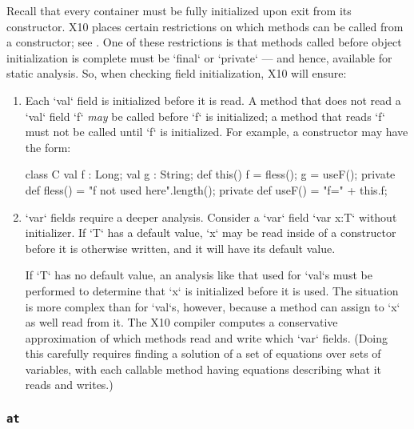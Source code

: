Recall that every container must be fully initialized upon exit
from its constructor.  
X10 places certain restrictions on which methods can be called from a
constructor; see .  One of these restrictions is that
methods called before object initialization is complete must be \xcd`final` or
\xcd`private` --- and hence, available for static analysis.  So, when checking
field initialization, X10 will ensure: 
\begin{enumerate}
\item Each \xcd`val` field is initialized before it is read.   
      A method that does not read a \xcd`val` field \xcd`f` {\em may} be
      called before \xcd`f` is initialized; a method that reads \xcd`f` must
      not be called until \xcd`f` is initialized.        
      For example, 
      a constructor may have the form:
\begin{xten}
class C {
  val f : Long;
  val g : String;
  def this() {
     f = fless();
     g = useF();
  }
  private def fless() = "f not used here".length();
  private def useF() = "f=" + this.f;
}
\end{xten}
%

\item \xcd`var` fields require a deeper analysis.  Consider a \xcd`var`
      field \xcd`var x:T`  without initializer.  If \xcd`T` has a default
      value, \xcd`x` may be read inside of a constructor before it is
      otherwise written, and it will 
      have its default value.   

      If \xcd`T` has no default value, an analysis
      like that used for \xcd`val`s must be performed to determine that
      \xcd`x` is initialized before it is used.  The situation is 
      more complex than for \xcd`val`s, however, because a method can assign to
      \xcd`x` as well read from it.  The X10 compiler computes a conservative
      approximation of which methods
      read and write which \xcd`var` fields. (Doing this carefully 
      requires finding a solution of a set of equations over sets of
      variables, with each callable method having equations describing what it
      reads and writes.)    

\end{enumerate}


\subsubsection{{\tt at} 
}


